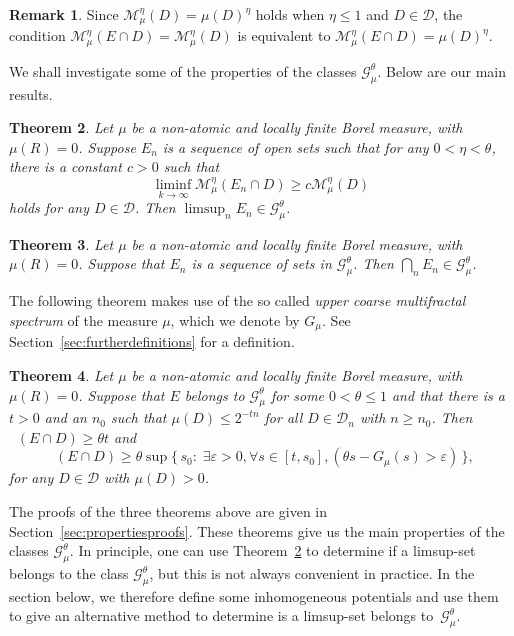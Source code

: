 \documentclass[11pt]{article}
\newtheorem{theo}{Theorem}[section]
\theoremstyle{definition}
\newtheorem{rema}[theo]{Remark}
\numberwithin{equation}{section}
\numberwithin{figure}{section}
\numberwithin{table}{section}
\DeclareMathOperator{\dimh}{dim_H}
\let\oldexists\exists
\renewcommand*{\exists}{\mathrel{\oldexists}}
\let\oldforall\forall
\renewcommand*{\forall}{\mathrel{\oldforall}}
\begin{document}
\begin{rema}
Since $\mathscr{M}_\mu^\eta (D) = \mu (D)^\eta$ holds when $\eta
\leq 1$ and $D \in \mathscr{D}$, the condition $\mathscr{M}_\mu^\eta (E \cap D) = \mathscr{M}_\mu^\eta (D)$ is equivalent to $\mathscr{M}_\mu^\eta (E \cap D) = \mu (D)^\eta$.
\end{rema}

We shall investigate some of the properties of the classes $\mathscr{G}_\mu^\theta$. Below are our main results.

\begin{theo}\label{the:limsup}
Let $\mu$ be a non-atomic and locally finite Borel measure, with $\mu (R) = 0$. Suppose $E_n$ is a sequence of open sets such that for any $0 < \eta < \theta$, there is a constant $c > 0$ such that
\[
\liminf_{k\to\infty} \mathscr{M}_\mu^\eta (E_n \cap D) \geq c
\mathscr{M}_\mu^\eta (D)
\]
holds for any $D \in \mathscr{D}$. Then $\limsup_n E_n \in
\mathscr{G}_\mu^\theta$.
\end{theo}

\begin{theo}\label{the:intersection}
Let $\mu$ be a non-atomic and locally finite Borel measure, with $\mu (R) = 0$. Suppose that $E_n$ is a sequence of sets in $\mathscr{G}_\mu^\theta$. Then $\bigcap_n E_n \in
\mathscr{G}_\mu^\theta$.
\end{theo}

The following theorem makes use of the so called \emph{upper coarse multifractal spectrum} of the measure $\mu$, which we denote by $G_\mu$. See Section~\ref{sec:furtherdefinitions} for a definition.

\begin{theo}\label{the:dimension}
Let $\mu$ be a non-atomic and locally finite Borel measure, with $\mu (R) = 0$. Suppose that $E$ belongs to $\mathscr{G}_\mu^\theta$ for some $0 < \theta \leq 1$ and that there is a $t > 0$ and an $n_0$ such that $\mu (D) \leq 2^{-tn}$ for all $D \in \mathscr{D}_n$ with $n \geq n_0$. Then $\dimh (E \cap D) \geq \theta t$ and
\[
\dimh (E \cap D) \geq \theta \sup \{\, s_0 :\; \exists \varepsilon > 0, \forall s\in [t,s_0], (\theta s - G_\mu (s) > \varepsilon) \,\},
\]
for any $D \in \mathscr{D}$ with $\mu (D) > 0$.
\end{theo}

The proofs of the three theorems above are given in Section~\ref{sec:propertiesproofs}. These theorems give us the main properties of the classes $\mathscr{G}_\mu^\theta$. In principle, one can use Theorem~\ref{the:limsup} to determine if a limsup-set belongs to the class $\mathscr{G}_\mu^\theta$, but this is not always convenient in practice. In the section below, we therefore define some inhomogeneous potentials and use them to give an alternative method to determine is a limsup-set belongs to~$\mathscr{G}_\mu^\theta$.
\end{document}
